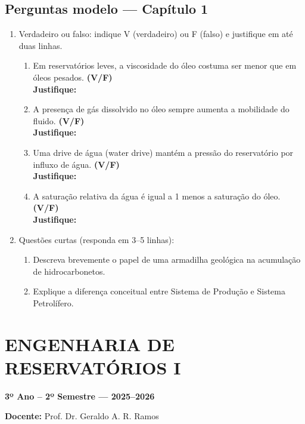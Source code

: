 \documentclass[11pt,a4paper]{article}
\begin{document}
\subsection{Perguntas modelo — Capítulo 1}
\begin{enumerate}
\item Verdadeiro ou falso: indique V (verdadeiro) ou F (falso) e justifique em até duas linhas.
\begin{enumerate}[label=\alph*)]
\item Em reservatórios leves, a viscosidade do óleo costuma ser menor que em óleos pesados. \hfill \textbf{(V/F)}\\
\textbf{Justifique:} \vspace{1\baselineskip}
\item A presença de gás dissolvido no óleo sempre aumenta a mobilidade do fluido. \hfill \textbf{(V/F)}\\
\textbf{Justifique:} \vspace{1\baselineskip}
\item Uma drive de água (water drive) mantém a pressão do reservatório por influxo de água. \hfill \textbf{(V/F)}\\
\textbf{Justifique:} \vspace{1\baselineskip}
\item A saturação relativa da água é igual a 1 menos a saturação do óleo. \hfill \textbf{(V/F)}\\
\textbf{Justifique:} \vspace{1\baselineskip}
\end{enumerate}
\item Questões curtas (responda em 3–5 linhas):
\begin{enumerate}[label=\alph*)]
\item Descreva brevemente o papel de uma armadilha geológica na acumulação de hidrocarbonetos.
\item Explique a diferença conceitual entre Sistema de Produção e Sistema Petrolífero.
\end{enumerate}
\end{enumerate}




\section{ENGENHARIA DE RESERVATÓRIOS I}
\textbf{3º Ano – 2º Semestre — 2025–2026}

\textbf{Docente:} Prof. Dr. Geraldo A. R. Ramos
\end{document}
